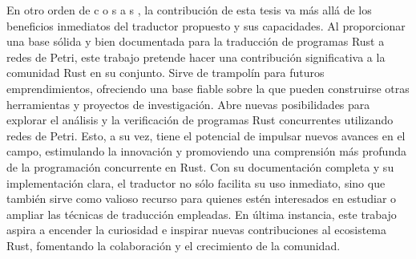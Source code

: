 En otro orden de c o s a s , la contribución de esta tesis va
más allá de los beneficios inmediatos del traductor propuesto y sus capacidades.
Al proporcionar una base sólida y bien documentada
para la traducción de programas Rust a redes de Petri, este trabajo pretende hacer una
contribución significativa a la comunidad Rust en su conjunto.
Sirve de trampolín para futuros emprendimientos,
ofreciendo una base fiable sobre la que pueden construirse otras herramientas y
proyectos de investigación.
Abre nuevas posibilidades para explorar el análisis y la verificación
de programas Rust concurrentes utilizando redes de Petri.
Esto, a su vez, tiene el potencial de impulsar nuevos avances en el campo,
estimulando la innovación y promoviendo una
comprensión más profunda de la programación concurrente en Rust.
Con su documentación completa y su implementación clara,
el traductor no sólo facilita su uso inmediato,
sino que también sirve como valioso recurso para quienes estén interesados
en estudiar o ampliar las técnicas de traducción empleadas.
En última instancia, este trabajo aspira a encender la curiosidad e
inspirar nuevas contribuciones al ecosistema Rust,
fomentando la colaboración y el crecimiento de la comunidad.